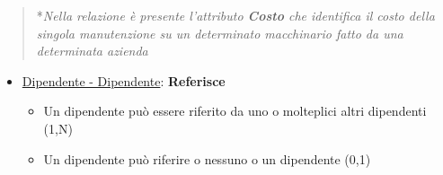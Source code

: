 \begin{verse}
	*\emph{Nella relazione è presente l'attributo \textbf{Costo} che identifica il costo della singola manutenzione su un determinato macchinario fatto da una determinata azienda}
\end{verse}

\begin{itemize}
	\item \underline{Dipendente - Dipendente}: \textbf{Referisce}
	
	\begin{itemize}
		\item Un dipendente può essere riferito da uno o molteplici altri dipendenti (1,N)
		\item Un dipendente può riferire o nessuno o un dipendente (0,1)
	\end{itemize}
	
\end{itemize}